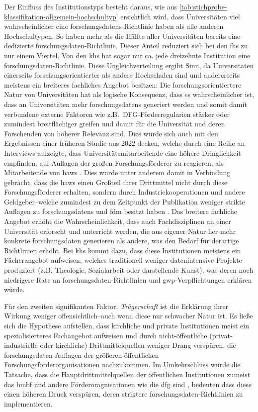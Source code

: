 Der Einfluss des Institutionstyps besteht daraus, wie aus \cref{tab:stichprobe-klassifikation-allgemein-hochschultyp} ersichtlich wird, dass Universitäten viel wahrscheinlicher eine \glspl{forschungsdaten}-Richtlinie haben als alle anderen Hochschultypen.
So haben mehr als die Hälfte aller Universitäten bereits eine dedizierte \gls{forschungsdaten}-Richtlinie. 
Dieser Anteil reduziert sich bei den \glspl{fh} zu nur einem Viertel.
Von den \glspl{kh} hat sogar nur ca. jede dreizehnte Institution eine \gls{forschungsdaten}-Richtlinie.
Diese Ungleichverteilung ergibt Sinn, da Universitäten einerseits forschungsorientierter als andere Hochschulen sind und andererseits meistens ein breiteres fachliches Angebot besitzen:
Die forschungsorientiertere Natur von Universitäten hat als logische Konsequenz, dass es wahrscheinlicher ist, dass an Universitäten mehr \glspl{forschungsdaten} generiert werden und somit damit verbundene externe Faktoren wie z.B.~DFG-Förderregularien stärker oder zumindest breitflächiger greifen und damit für die Universität und deren Forschenden von höherer Relevanz sind.
Dies würde sich auch mit den Ergebnissen einer früheren Studie aus 2022 decken, welche durch eine Reihe an Interviews aufzeigte, dass Universitätsmitarbeitende eine höhere Dringlichkeit empfinden, auf Auflagen der großen Forschungsförderer zu reagieren, als Mitarbeitende von \glspl{haw} \autocite[9]{Dellmann2022}.
Dies wurde unter anderem damit in Verbindung gebracht, dass die \glspl{haw} einen Großteil ihrer Drittmittel nicht durch diese Forschungsförderer erhalten, sondern durch Industriekooperationen und andere Geldgeber--welche zumindest zu dem Zeitpunkt der Publikation weniger strikte Auflagen zu \glspl{forschungsdaten} und \gls{fdm} besitzt haben \autocite{Dellmann2022}.
Das breitere fachliche Angebot erhöht die Wahrscheinlichkeit, dass auch Fachdisziplinen an einer Universität erforscht und unterricht werden, die aus eigener Natur her mehr konkrete \gls{forschungsdaten} generieren als andere, was den Bedarf für derartige Richtlinien erhöht.
Bei \glspl{kh} kommt dazu, dass diese Institutionen meistens ein Fächerangebot aufweisen, welches traditionell weniger datenintensive Projekte produziert (z.B. Theologie, Sozialarbeit oder darstellende Kunst), was deren noch niedrigere Rate an \gls{forschungsdaten}-Richtlinien und \gls{gwp}-Verpflichtungen erklären würde.

Für den zweiten signifikanten Faktor, \textit{Trägerschaft} ist die Erklärung ihrer Wirkung weniger offensichtlich--auch wenn diese nur schwacher Natur ist.
Es ließe sich die Hypothese aufstellen, dass kirchliche und private Institutionen meist ein spezialisierteres Fachangebot aufweisen und durch nicht-öffentliche (privat-industrielle oder kirchliche) Drittmittelquellen weniger Drang verspüren, die \gls{forschungsdaten}-Auflagen der größeren öffentlichen Forschungsförderorganisationen nachzukommen.
Im Umkehrschluss würde die Tatsache, dass die Hauptdrittmittelquellen der öffentlichen Institutionen zumeist das \gls{bmbf} und andere Förderoragnisationen wie die \gls{dfg} sind \autocite{Dellmann2022}, bedeuten dass diese einen höheren Druck verspüren, deren striktere \gls{forschungsdaten}-Richtlinien zu implementieren.

